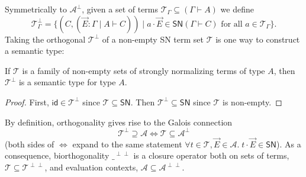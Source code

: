 \documentclass[a4paper,USenglish,cleveref, autoref, thm-restate]{lipics-v2021}
\newcommand{\tid}{\mathsf{id}}
\newcommand{\A}{\mathcal{A}}
\newcommand{\T}{\mathcal{T}}
\newcommand{\SN}{\mathsf{SN}}
\begin{document}
\noindent
Symmetrically to $\A^\perp$, given a set of terms $\T_\Gamma \subseteq
(\Gamma \vdash A)$ we define
\[
  \T_\Gamma^\perp =
  \{ (C, (\vec E : \Gamma \mid A \vdash C)) \mid
  a \cdot \vec E \in \SN(\Gamma \vdash C)
  \mbox{ for all } a \in \T_\Gamma \}
  .
\]
Taking the orthogonal $\T^\perp$ of a non-empty SN term set $\T$ is one way to
construct a semantic type:
\begin{lemma}
  \label{lem:orthsem}
  If $\T$ is a family of non-empty sets of strongly normalizing terms
  of type $A$, then
  $\T^\perp$ is a semantic type for type $A$.
\end{lemma}
\begin{proof}
  First, $\tid \in \T^\perp$ since $\T \subseteq \SN$.
  Then $\T^\perp \subseteq \SN$ since $\T$ is non-empty.
\end{proof}
%
By definition, orthogonality gives rise to the Galois
connection
\[
  \T^\perp \supseteq \A \iff \T \subseteq \A^\perp
\]
(both sides of $\iff$ expand to the same statement $\forall t \in \T,
\vec E \in \A.\; t \cdot \vec E \in \SN$).  As a consequence,
biorthogonality $\_^{\perp\perp}$ is a closure operator both on sets
of terms, $\T \subseteq \T^{\perp\perp}$, and evaluation contexts,
$\A \subseteq \A^{\perp\perp}$.
\end{document}
